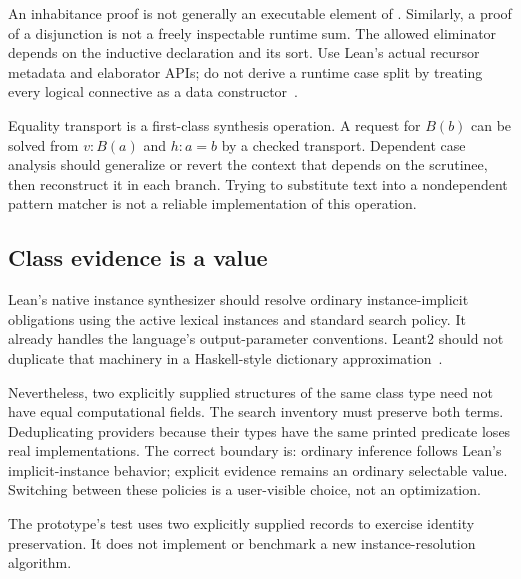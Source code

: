 An inhabitance proof  is not generally an executable element of . Similarly, a proof of a disjunction is not a freely inspectable runtime sum. The allowed eliminator depends on the inductive declaration and its sort. Use Lean's actual recursor metadata and elaborator APIs; do not derive a runtime case split by treating every logical connective as a data constructor~\cite{lean-inductive}.

Equality transport is a first-class synthesis operation. A request for $B(b)$ can be solved from $v:B(a)$ and $h:a=b$ by a checked transport. Dependent case analysis should generalize or revert the context that depends on the scrutinee, then reconstruct it in each branch. Trying to substitute text into a nondependent pattern matcher is not a reliable implementation of this operation.

\subsection{Class evidence is a value}

Lean's native instance synthesizer should resolve ordinary instance-implicit obligations using the active lexical instances and standard search policy. It already handles the language's output-parameter conventions. Leant2 should not duplicate that machinery in a Haskell-style dictionary approximation~\cite{lean-instances}.

Nevertheless, two explicitly supplied structures of the same class type need not have equal computational fields. The search inventory must preserve both terms. Deduplicating providers because their types have the same printed predicate loses real implementations. The correct boundary is: ordinary inference follows Lean's implicit-instance behavior; explicit evidence remains an ordinary selectable value. Switching between these policies is a user-visible choice, not an optimization.

The prototype's  test uses two explicitly supplied records to exercise identity preservation. It does not implement or benchmark a new instance-resolution algorithm.
